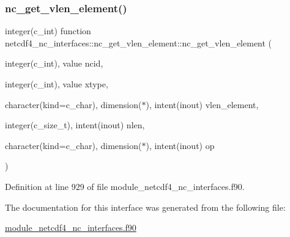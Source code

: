 \subsubsection{\texorpdfstring{nc\+\_\+get\+\_\+vlen\+\_\+element()}{nc\_get\_vlen\_element()}}
{\footnotesize\ttfamily integer(c\+\_\+int) function netcdf4\+\_\+nc\+\_\+interfaces\+::nc\+\_\+get\+\_\+vlen\+\_\+element\+::nc\+\_\+get\+\_\+vlen\+\_\+element (\begin{DoxyParamCaption}\item[{integer(c\+\_\+int), value}]{ncid,  }\item[{integer(c\+\_\+int), value}]{xtype,  }\item[{character(kind=c\+\_\+char), dimension($\ast$), intent(inout)}]{vlen\+\_\+element,  }\item[{integer(c\+\_\+size\+\_\+t), intent(inout)}]{nlen,  }\item[{character(kind=c\+\_\+char), dimension($\ast$), intent(inout)}]{op }\end{DoxyParamCaption})}



Definition at line 929 of file module\+\_\+netcdf4\+\_\+nc\+\_\+interfaces.\+f90.



The documentation for this interface was generated from the following file\+:\begin{DoxyCompactItemize}
\item 
\hyperlink{module__netcdf4__nc__interfaces_8f90}{module\+\_\+netcdf4\+\_\+nc\+\_\+interfaces.\+f90}\end{DoxyCompactItemize}
